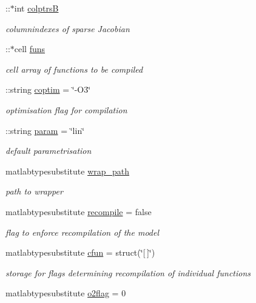 \begin{DoxyCompactItemize}
\+::$\ast$int \hyperlink{classamimodel_a3a4891c5565b544dd7d4362dbbfaadf7}{colptrs\+B}
\begin{DoxyCompactList}\small\item\em columnindexes of sparse Jacobian \end{DoxyCompactList}\item 
\+::$\ast$cell \hyperlink{classamimodel_af80b2560853c3df2b09fef2a198cf5b8}{funs}
\begin{DoxyCompactList}\small\item\em cell array of functions to be compiled \end{DoxyCompactList}\item 
\+::string \hyperlink{classamimodel_ad99abcd270ac97546c46292ebc6c2e0a}{coptim} = \char`\"{}-\/O3\char`\"{}
\begin{DoxyCompactList}\small\item\em optimisation flag for compilation \end{DoxyCompactList}\item 
\+::string \hyperlink{classamimodel_a51f20d6b1b54a2eee3be0e8adc96a0ae}{param} = \char`\"{}lin\char`\"{}
\begin{DoxyCompactList}\small\item\em default parametrisation \end{DoxyCompactList}\item 
matlabtypesubstitute \hyperlink{classamimodel_a0b316a20054ba282555674d939a82406}{wrap\+\_\+path}
\begin{DoxyCompactList}\small\item\em path to wrapper \end{DoxyCompactList}\item 
matlabtypesubstitute \hyperlink{classamimodel_a8d2e824e03e32034b634a7c48f2a26c6}{recompile} = false
\begin{DoxyCompactList}\small\item\em flag to enforce recompilation of the model \end{DoxyCompactList}\item 
matlabtypesubstitute \hyperlink{classamimodel_afec809c626a350367485aa6aaea6b585}{cfun} = struct(\char`\"{}\mbox{[}$\,$\mbox{]}\char`\"{})
\begin{DoxyCompactList}\small\item\em storage for flags determining recompilation of individual functions \end{DoxyCompactList}\item 
matlabtypesubstitute \hyperlink{classamimodel_a2b89e3b4e249878a2d436ee337952c4f}{o2flag} = 0

\end{DoxyCompactItemize}
